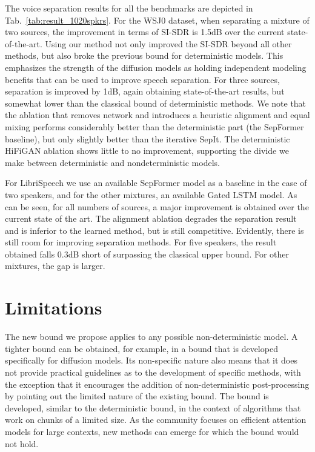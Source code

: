 \documentclass{article}
\theoremstyle{plain}
\theoremstyle{definition}
\theoremstyle{remark}
\begin{document}
 The voice separation results for all the benchmarks are depicted in Tab.~\ref{tab:result_1020spkrs}. For the {WSJ0} dataset, 
when separating a mixture of two sources, the improvement in terms of SI-SDR is 1.5dB over the current state-of-the-art. Using our method not only improved the SI-SDR beyond all other methods, but also broke the previous bound for deterministic models. This emphasizes the strength of the diffusion models as holding independent modeling benefits that can be used to improve speech separation. For three sources, separation is improved by 1dB, again obtaining state-of-the-art results, but somewhat lower than the classical bound of deterministic methods. We note that the ablation that removes network  and introduces a heuristic alignment and equal mixing performs considerably better than the deterministic part (the SepFormer baseline), but only slightly better than the iterative SepIt.
The deterministic HiFiGAN ablation shows little to no improvement, supporting the divide we make between deterministic and nondeterministic models.

For {LibriSpeech}  we use an available SepFormer model as a baseline in the case of two speakers, and for the other mixtures, an available Gated LSTM model. As can be seen, for all numbers of sources, a major improvement is obtained over the current state of the art. The alignment ablation degrades the separation result and is inferior to the learned method, but is still competitive. Evidently, there is still room for improving separation methods. For five speakers, the result obtained  falls 0.3dB short of surpassing the classical upper bound. For other mixtures, the gap is larger.






\section{Limitations}

The new bound we propose applies to any possible non-deterministic model. A tighter bound can be obtained, for example, in a bound that is developed specifically for diffusion models. Its non-specific nature also means that it does not provide practical guidelines as to the development of specific methods, with the exception that it encourages the addition of non-deterministic post-processing by pointing out the limited nature of the existing bound. The bound is developed, similar to the deterministic bound, in the context of algorithms that work on chunks of a limited size. As the community focuses on efficient attention models for large contexts, new methods can emerge for which the bound would not hold. 
\end{document}
